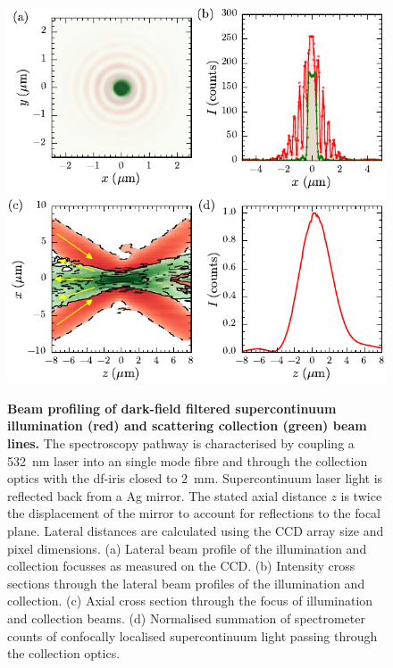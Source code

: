 \documentclass{article}
\begin{document}
\begin{figure}[bt]
\centering
{\includegraphics{figures/beam_profile}}
{\caption[Beam profiling of supercontinuum illumination and scattering collection beam lines.]{\textbf{Beam profiling of dark-field filtered supercontinuum illumination (red) and scattering collection (green) beam lines.} The spectroscopy pathway is characterised by coupling a \SI{532}{nm} laser into an single mode fibre and through the collection optics with the \gls{df}-iris closed to \SI{2}{mm}. Supercontinuum laser light is reflected back from a Ag mirror. The stated axial distance $z$ is twice the displacement of the mirror to account for reflections to the focal plane. Lateral distances are calculated using the CCD array size and pixel dimensions. (a) Lateral beam profile of the illumination and collection focusses as measured on the CCD. (b) Intensity cross sections through the lateral beam profiles of the illumination and collection. (c) Axial cross section through the focus of illumination and collection beams. (d) Normalised summation of spectrometer counts of confocally localised supercontinuum light passing through the collection optics.}
\label{fig:beam_profile}}
\end{figure}
\end{document}
